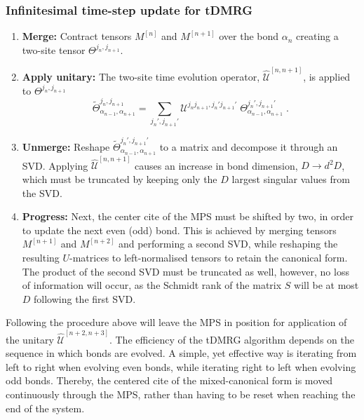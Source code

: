 \subsubsection{Infinitesimal time-step update for tDMRG}
\begin{enumerate}
\item
\textbf{Merge:} Contract tensors $M^{[n]}$ and $M^{[n+1]}$ over the bond $\alpha_{n}$ creating a two-site tensor $\Theta^{j_n , j_{n+1}}$.

\item
\textbf{Apply unitary:} The two-site time evolution operator, $\hat{\mathcal{U}}^{[n, n+1]}$, is applied to $\Theta^{j_n , j_{n+1}}$
\begin{equation}
	\tilde{\Theta}_{\alpha_{n-1} , \alpha_{n+1}}^{j_n , j_{n+1} } = \sum_{j_n ', j_{n+1}'} \mathcal{U}^{j_n  j_{n+1} , j_n '  j_{n+1}'} \; \Theta_{\alpha_{n-1} , \alpha_{n+1}}^{j_n ', j_{n+1} ' } \; .
\end{equation}

\item
\textbf{Unmerge:} Reshape $\tilde{\Theta}_{\alpha_{n-1} , \alpha_{n+1}}^{j_n ', j_{n+1} '}$ to a matrix and decompose it through an SVD. Applying $\hat{\mathcal{U}}^{[n, n+1]}$ causes an increase in bond dimension, $D \rightarrow d^2 D$, which must be truncated by keeping only the $D$ largest singular values from the SVD. 

\item
\textbf{Progress:}  Next, the center cite of the MPS must be shifted by two, in order to update the next even (odd) bond. This is achieved by merging tensors $M^{[n+1]}$ and $M^{[n+2]}$ and performing a second SVD, while reshaping the resulting $U$-matrices to left-normalised tensors to retain the canonical form. The product of the second SVD must be truncated as well, however, no loss of information will occur, as the Schmidt rank of the matrix $S$ will be at most $D$ following the first SVD. 
\end{enumerate}
Following the procedure above will leave the MPS in position for application of the unitary $\hat{\mathcal{U}}^{[n+2 , n+3]}$. The efficiency of the tDMRG algorithm depends on the sequence in which bonds are evolved. A simple, yet effective way is iterating from left to right when evolving even bonds, while iterating right to left when evolving odd bonds. Thereby, the centered cite of the mixed-canonical form is moved continuously through the MPS, rather than having to be reset when reaching the end of the system.

